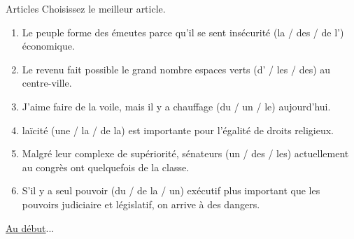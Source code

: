 \begin{frame}{Articles}
  \small
  Choisissez le meilleur article.
  \begin{enumerate}
    \item Le peuple forme des émeutes parce qu'il se sent \underline{} insécurité (la / des / de l') économique.
    \item Le revenu fait possible le grand nombre \underline{} espaces verts (d' / les / des) au centre-ville.
    \item J'aime faire de la voile, mais il y a \underline{} chauffage (du / un / le) aujourd'hui.
    \item \underline{} laïcité (une / la / de la) est importante pour l'égalité de droits religieux.
    \item Malgré leur complexe de supériorité, \underline{} sénateurs (un / des / les) actuellement au congrès ont quelquefois de la classe.
    \item S'il y a \underline{} seul pouvoir (du / de la / un) exécutif plus important que les pouvoirs judiciaire et législatif, on arrive à des dangers.
  \end{enumerate}
  \raggedleft\raggedleft\hyperlink{début}{Au début}...
\end{frame}